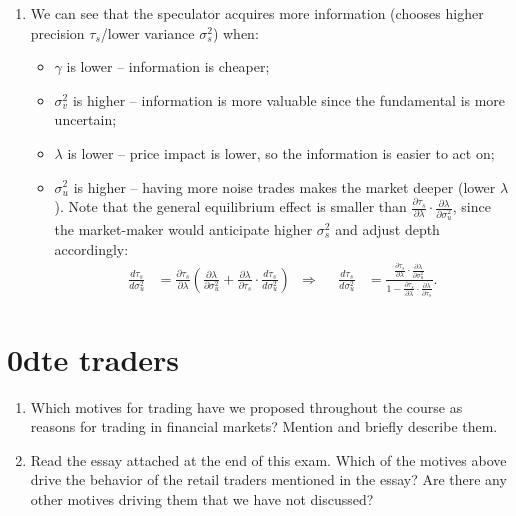 \documentclass[a4paper]{article}
\begin{document}
\begin{enumerate}
	\item We can see that the speculator acquires more information (chooses higher precision $\tau_s$/lower variance $\sigma^2_s$) when:
	\begin{itemize}
		\item $\gamma$ is lower -- information is cheaper;
		\item $\sigma^2_v$ is higher -- information is more valuable since the fundamental is more uncertain;
		\item $\lambda$ is lower -- price impact is lower, so the information is easier to act on;
		\item $\sigma^2_u$ is higher -- having more noise trades makes the market deeper (lower $\lambda$). Note that the general equilibrium effect is smaller than $\frac{\partial \tau_s}{\partial \lambda} \cdot \frac{\partial \lambda}{\partial \sigma^2_u}$, since the market-maker would anticipate higher $\sigma^2_s$ and adjust depth accordingly:
		\begin{align*}
			\frac{d \tau_s}{d \sigma^2_u} &= \frac{\partial \tau_s}{\partial \lambda} \left( \frac{\partial \lambda}{\partial \sigma^2_u} + \frac{\partial \lambda}{\partial \tau_s} \cdot \frac{d \tau_s}{d \sigma^2_u} \right)
			&\Rightarrow &&
			\frac{d \tau_s}{d \sigma^2_u} &= \frac{ \frac{\partial \tau_s}{\partial \lambda} \cdot \frac{\partial \lambda}{\partial \sigma^2_u} }{ 1 - \frac{\partial \tau_s}{\partial \lambda} \cdot \frac{\partial \lambda}{\partial \tau_s}}.
		\end{align*}
	\end{itemize}
\end{enumerate}
\fi




\section{0dte traders}

\begin{enumerate}
	\item Which motives for trading have we proposed throughout the course as reasons for trading in financial markets? Mention and briefly describe them.
	
	\item Read the essay attached at the end of this exam. Which of the motives above drive the behavior of the retail traders mentioned in the essay? Are there any other motives driving them that we have not discussed?
\end{enumerate}
\end{document}
